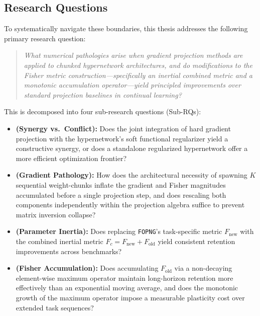 \subsection*{Research Questions}

To systematically navigate these boundaries, this thesis addresses the following
primary research question:

\begin{quote}
    \emph{What numerical pathologies arise when gradient projection methods
    are applied to chunked hypernetwork architectures, and do modifications
    to the Fisher metric construction---specifically an inertial combined
    metric and a monotonic accumulation operator---yield principled
    improvements over standard projection baselines in continual learning?}
\end{quote}

This is decomposed into four sub-research questions (Sub-RQs):
\begin{itemize}
    \item[\textbf{Sub-RQ1}] \textbf{(Synergy vs.\ Conflict):} Does the joint
    integration of hard gradient projection with the hypernetwork's soft
    functional regularizer yield a constructive
    synergy, or does a standalone regularized hypernetwork offer a more
    efficient optimization frontier?

    \item[\textbf{Sub-RQ2}] \textbf{(Gradient Pathology):} How does the
    architectural necessity of spawning $K$ sequential weight-chunks inflate
    the gradient and Fisher magnitudes accumulated before a single projection
    step, and does rescaling both components independently within the
    projection algebra suffice to prevent matrix inversion collapse?

    \item[\textbf{Sub-RQ3}] \textbf{(Parameter Inertia):} Does replacing
    \texttt{FOPNG}'s task-specific metric $F_{\mathrm{new}}$ with the
    combined inertial metric $F_c = F_{\mathrm{new}} + F_{\mathrm{old}}$
    yield consistent retention improvements across benchmarks?

    \item[\textbf{Sub-RQ4}] \textbf{(Fisher Accumulation):} Does accumulating
    $F_{\mathrm{old}}$ via a non-decaying element-wise maximum operator
    maintain long-horizon retention more effectively than an exponential moving
    average, and does the monotonic growth of the maximum operator impose a
    measurable plasticity cost over extended task sequences?
\end{itemize}

